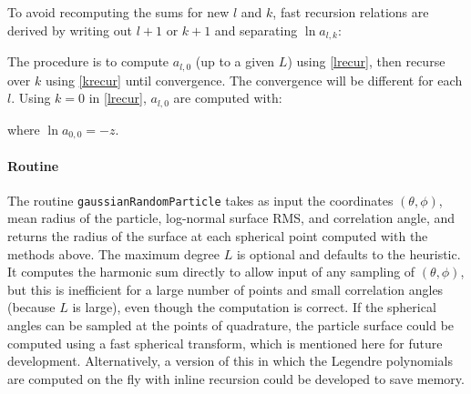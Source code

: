 To avoid recomputing the sums for new $l$ and $k$, fast recursion relations are derived by writing out $l+1$ or $k+1$ and separating $\ln a_{l,k}$: 




The procedure is to compute $a_{l,0}$ (up to a given $L$) using \eqref{lrecur}, then recurse over $k$ using \eqref{krecur} until convergence. The convergence will be different for each $l$.  Using $k=0$ in \eqref{lrecur}, $a_{l,0}$ are computed with: 

\noindent where $\ln a_{0,0} = -z $. 

\paragraph{Routine}
The routine \texttt{gaussianRandomParticle} takes as input the coordinates $(\theta,\phi)$, mean radius of the particle, log-normal surface RMS, and correlation angle, and returns the radius of the surface at each spherical point computed with the methods above. The maximum degree $L$ is optional and defaults to the heuristic. It computes the harmonic sum directly to allow input of any sampling of $(\theta,\phi)$, but this is inefficient for a large number of points and small correlation angles (because $L$ is large), even though the computation is correct. If the spherical angles can be sampled at the points of quadrature, the particle surface could be computed using a fast spherical transform, which is mentioned here for future development. Alternatively, a version of this in which the Legendre polynomials are computed on the fly with inline recursion could be developed to save memory.

